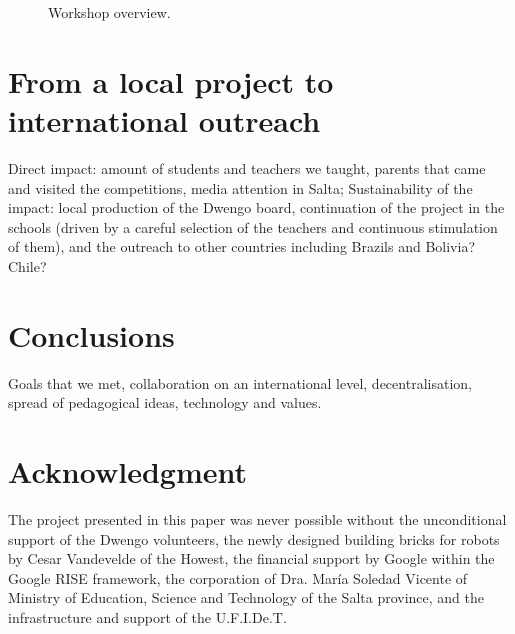 \documentclass[a4paper]{llncs}
\begin{document}
\begin{figure}[htp]
\caption[]{Workshop overview.}
\end{figure}

\section{From a local project to international outreach}
Direct impact: amount of students and teachers we taught, parents that came and visited the competitions, media attention in Salta; Sustainability of the impact: local production of the Dwengo board, continuation of the project in the schools (driven by a careful selection of the teachers and continuous stimulation of them), and the outreach to other countries including Brazils and Bolivia? Chile?

\section{Conclusions}
Goals that we met, collaboration on an international level, decentralisation, spread of pedagogical ideas, technology and values.


\section*{Acknowledgment}
The project presented in this paper was never possible without the unconditional support of the Dwengo volunteers, the newly designed building bricks for robots by Cesar Vandevelde of the Howest, the financial support by Google within the Google RISE framework, the corporation of Dra. Mar\'ia Soledad Vicente of Ministry of Education, Science and Technology of the Salta province, and the infrastructure and support of the U.F.I.De.T.



\end{document}
